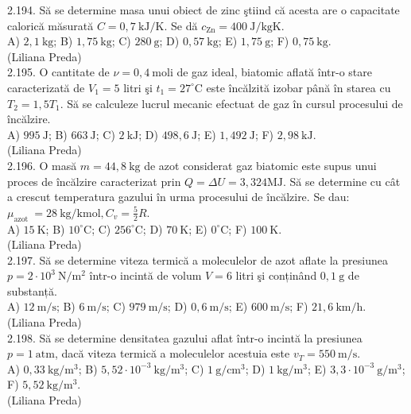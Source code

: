 2.194. Să se determine masa unui obiect de zinc ştiind că acesta are o capacitate calorică măsurată $C=0,7 \mathrm{~kJ} / \mathrm{K}$. Se dă $c_{\mathrm{Zn}}=400 \mathrm{~J} / \mathrm{kgK}$.\\ A) $2,1 \mathrm{~kg}$; B) $1,75 \mathrm{~kg}$; C) $280 \mathrm{~g}$; D) $0,57 \mathrm{~kg}$; E) $1,75 \mathrm{~g}$; F) $0,75 \mathrm{~kg}$.\\ (Liliana Preda)\\

2.195. O cantitate de $\nu=0,4 \mathrm{~moli}$ de gaz ideal, biatomic aflată într-o stare caracterizată de $V_{1}=5$ litri şi $t_{1}=27^{\circ} \mathrm{C}$ este încălzită izobar până în starea cu $T_{2}=1,5 T_{1}$. Să se calculeze lucrul mecanic efectuat de gaz în cursul procesului de încălzire.\\ A) $995 \mathrm{~J}$; B) $663 \mathrm{~J}$; C) $2 \mathrm{~kJ}$; D) $498,6 \mathrm{~J}$; E) $1,492 \mathrm{~J}$; F) $2,98 \mathrm{~kJ}$.\\ (Liliana Preda)\\

2.196. O masă $m=44,8 \mathrm{~kg}$ de azot considerat gaz biatomic este supus unui proces de încălzire caracterizat prin $Q=\Delta U=3,324 \mathrm{MJ}$. Să se determine cu cât a crescut temperatura gazului în urma procesului de încălzire. Se dau: $\mu_{\text {azot }}=28 \mathrm{~kg} / \mathrm{kmol}, C_{v}=\frac{5}{2} R$.\\ A) $15 \mathrm{~K}$; B) $10^{\circ} \mathrm{C}$; C) $256^{\circ} \mathrm{C}$; D) $70 \mathrm{~K}$; E) $0^{\circ} \mathrm{C}$; F) $100 \mathrm{~K}$.\\ (Liliana Preda)\\

2.197. Să se determine viteza termică a moleculelor de azot aflate la presiunea $p=2 \cdot 10^{3} \mathrm{~N} / \mathrm{m}^{2}$ într-o incintă de volum $V=6$ litri şi conținând $0,1 \mathrm{~g}$ de substanță.\\ A) $12 \mathrm{~m} / \mathrm{s}$; B) $6 \mathrm{~m} / \mathrm{s}$; C) $979 \mathrm{~m} / \mathrm{s}$; D) $0,6 \mathrm{~m} / \mathrm{s}$; E) $600 \mathrm{~m} / \mathrm{s}$; F) $21,6 \mathrm{~km} / \mathrm{h}$.\\ (Liliana Preda)\\

2.198. Să se determine densitatea gazului aflat într-o incintă la presiunea $p=1 \mathrm{~atm}$, dacă viteza termică a moleculelor acestuia este $v_{T}=550 \mathrm{~m} / \mathrm{s}$.\\ A) $0,33 \mathrm{~kg} / \mathrm{m}^{3}$; B) $5,52 \cdot 10^{-3} \mathrm{~kg} / \mathrm{m}^{3}$; C) $1 \mathrm{~g} / \mathrm{cm}^{3}$; D) $1 \mathrm{~kg} / \mathrm{m}^{3}$; E) $3,3 \cdot 10^{-3} \mathrm{~g} / \mathrm{m}^{3}$; F) $5,52 \mathrm{~kg} / \mathrm{m}^{3}$.\\ (Liliana Preda)\\

